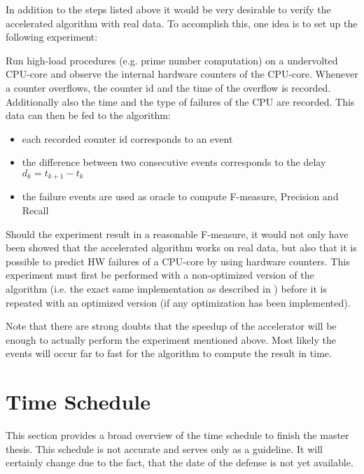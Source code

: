 \documentclass[12pt]{article} %
\begin{document}
In addition to the steps listed above it would be very desirable to verify the
accelerated algorithm with real data. To accomplish this, one idea is to set up
the following experiment:

Run high-load procedures (e.g. prime number computation) on a undervolted
CPU-core and observe the internal hardware counters of the CPU-core. Whenever
a counter overflows, the counter id and the time of the overflow is recorded.
Additionally also the time and the type of failures of the CPU are recorded.
This data can then be fed to the algorithm:
\begin{itemize}
    \item each recorded counter id corresponds to an event
    \item the difference between two consecutive events corresponds to the
        delay $ d_k = t_{k+1} - t_k $
    \item the failure events are used as oracle to compute F-measure, Precision
        and Recall
\end{itemize}
Should the experiment result in a reasonable F-measure, it would not only have
been showed that the accelerated algorithm works on real data, but also that it
is possible to predict HW failures of a CPU-core by using hardware counters.
This experiment must first be performed with a non-optimized version of the
algorithm (i.e. the exact same implementation as described in \cite{salfner08})
before it is repeated with an optimized version (if any optimization has been
implemented).

Note that there are strong doubts that the speedup of the accelerator will be
enough to actually perform the experiment mentioned above. Most likely the
events will occur far to fast for the algorithm to compute the result in time.


\section{Time Schedule} %
This section provides a broad overview of the time schedule to finish the
master thesis. This schedule is not accurate and serves only as a guideline. It
will certainly change due to the fact, that the date of the defense is not yet
available.
\end{document}
